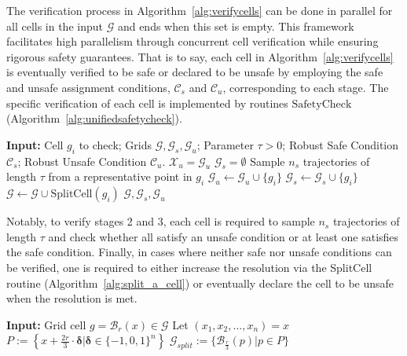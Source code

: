 \documentclass[letterpaper, 10 pt, conference]{ieeeconf}
\begin{document}
The verification process in Algorithm~\ref{alg:verifycells} can be done in parallel for all cells in the input $\mathcal{G}$ and ends when this set is empty. This framework facilitates high parallelism through concurrent cell verification while ensuring rigorous safety guarantees. That is to say, each cell in Algorithm~\ref{alg:verifycells} is eventually verified to be safe or declared to be unsafe by employing the safe and unsafe assignment conditions, $\mathcal{C}_{s}$ and $\mathcal{C}_{u}$, corresponding to each stage. The specific verification of each cell is implemented by routines $\mathrm{SafetyCheck}$ (Algorithm~\ref{alg:unifiedsafetycheck}). 

\begin{algorithm}[H]
\caption{SafetyCheck($g_i, \mathcal{G}, \mathcal{G}_{u}, \tau, \mathcal{C}_{s}, \mathcal{C}_{u}$)}
\label{alg:unifiedsafetycheck}
\begin{algorithmic}[1]
\State \textbf{Input:} Cell $g_i$ to check; Grids $\mathcal{G}, \mathcal{G}_{s}, \mathcal{G}_{u}$; Parameter $\tau > 0$; Robust Safe Condition $\mathcal{C}_{s}$; Robust Unsafe Condition $\mathcal{C}_{u}$.
\State $\mathcal{X}_{u} = \mathcal{G}_{u}$
\State $\mathcal{G}_{s} = \emptyset$
\State Sample $n_s$ trajectories of length $\tau$ from a representative point in $g_i$
    \State $\mathcal{G}_u \gets \mathcal{G}_u \cup \{g_i\}$
    \State $\mathcal{G}_s \gets \mathcal{G}_s \cup \{g_i\}$
\Else      
    \State $\mathcal{G} \gets \mathcal{G} \cup \mathrm{SplitCell}(g_i)$
\EndIf
\State \Return $\mathcal{G}, \mathcal{G}_{s}, \mathcal{G}_{u}$
\end{algorithmic}
\end{algorithm}

Notably, to verify stages 2 and 3, each cell is required to sample $n_s$ trajectories of length $\tau$ and check whether all satisfy an unsafe condition or at least one satisfies the safe condition. Finally, in cases where neither safe nor unsafe conditions can be verified, one is required to either increase the resolution via the SplitCell routine (Algorithm~\ref{alg:split_a_cell}) or eventually declare the cell to be unsafe when the resolution is met.

\begin{algorithm}[ht]
\caption{SplitCell($g$)}
\label{alg:split_a_cell}
\begin{algorithmic}[1]
\State \textbf{Input:} Grid cell $g = \mathcal{B}_r(x) \in \mathcal{G}$
\State Let $(x_1, x_2, \dots, x_n) = x$
\State $P := \left\{ x + \frac{2r}{3} \cdot \boldsymbol{\delta} | \boldsymbol{\delta} \in \{-1, 0, 1\}^n \right\}$
\State \Return $\mathcal{G}_{split} := \{ \mathcal{B}_{\frac{r}{3}}(p)|p \in P\}$
\end{algorithmic}
\end{algorithm}
\end{document}
